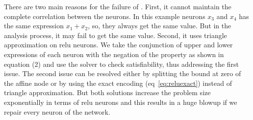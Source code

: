 \hspace*{-1cm}
\quad
{}  

There are two main reasons for the failure of \deeppoly{}. First, it cannot maintain the complete correlation 
between the neurons. In this example neurons $x_3$ and $x_4$ has the same expression $x_1+x_2$, so, they always
get the same value. But in the \deeppoly{} analysis process, it may fail to get the same value. Second, it uses triangle
approximation on relu neurons.
We take the conjunction of upper and lower expressions of each neuron with the negation of the property
as shown in equation (2)%
and use the \milp{} solver to check satisfiability, thus addressing the first issue.  
The second issue can be resolved either by splitting the bound at zero of the 
affine node or by using the exact encoding (eq~\ref{eq:reluexact}) 
instead of triangle approximation. 
But both solutions increase the problem size exponentially in terms of relu neurons and this results in a huge 
blowup if we repair every neuron of the network. 

